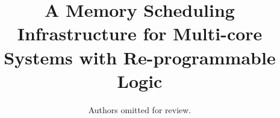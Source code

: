 \documentclass[10pt,conference]{IEEEtran}
\begin{document}
\newcommand\schim{SchIM\xspace}
\newcommand\schimL{Scheduler In-the-Middle\xspace}
\newcommand\schiml{scheduler in-the-middle\xspace}
\newcommand\axiin[1]{$\texttt{HPM}_{#1}$\xspace}
\newcommand\axiout[1]{$\texttt{HPS}_{#1}$\xspace}
\newcommand\axiconf[1]{$\texttt{LPM}_{#1}$\xspace}

\newcommand{\fig}[1]{Fig.~\ref{#1}}

\newcommand*\circledfig[2]{Fig.~\ref{#1}\tikz[baseline=0pt]{\node[anchor=south west,red,shape=circle,draw,inner sep=1pt] (char) {\scriptsize#2};}}

\newcommand*\circled[1]{\tikz[baseline=0pt]{\node[anchor=south west,red,shape=circle,draw,inner sep=1pt] (char) {\scriptsize#1};}}

\title{A Memory Scheduling Infrastructure for Multi-core Systems with
  Re-programmable Logic
}

\author{
    Authors omitted for review.
}

\maketitle
\end{document}
